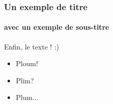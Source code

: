 \begin{frame}
	
	\frametitle{Un exemple de titre}
	\framesubtitle{avec un exemple de sous-titre}
	Enfin, le texte ! :)
\end{frame}

\begin{frame}
	\begin{itemize}
		\item<1,3> Ploum!
		\item<2-4> Plim?
		\item Plum...
	\end{itemize}
\end{frame}
		
